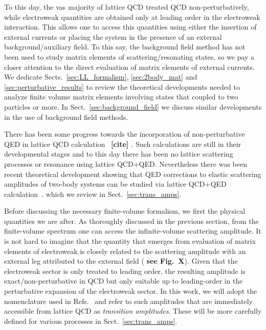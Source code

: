 \documentclass{iopart}
\newcommand{\raul}[0]{\bf \color{blue} }
\theoremstyle{definition}
\begin{document}
{To this day, the vas majority of lattice QCD treated QCD non-perturbatively, while electroweak quantities are obtained only at leading order in the electroweak interaction. This allows one to access this quantities  using either the insertion of external currents or placing the system in the presence of an external background/auxiliary field. To this say, the background field method has not been used to study matrix elements of scattering/resonating states, so we pay a closer attention to the direct evaluation of matrix elements of external currents. We dedicate Sects.~\ref{sec:LL_formalism}, \ref{sec:2body_mat} and \ref{sec:perturbative_results} to review the theoretical developments needed to analyze finite volume matrix elements involving states that coupled to two particles or more. In Sect.~\ref{sec:background_field} we discuss similar developments in the use of background field methods.  

There has been some progress towards the incorporation of non-perturbative QED in lattice QCD calculation~{\raul [cite] \cite{Endres:2015gda}}. Such calculations are still in their developmental stages and to this day there has been no lattice scattering processes or resonance using lattice QCD+QED. Nevertheless there was been recent theoretical development showing that QED corrections to elastic scattering amplitudes of two-body systems can be studied via lattice QCD+QED calculation~\cite{Beane:2014qha}. which we review in Sect.~\ref{sec:trans_amps}.

Before discussing the necessary finite-volume formalism, we first the physical quantities we are after. As thoroughly discussed in the previous section, from the finite-volume spectrum one can access the infinite-volume scattering amplitude. It is not hard to imagine that the quantity that emerges from evaluation of matrix elements of electroweak is closely related to the scattering amplitude with an external leg attributed to the external field ({\raul see Fig.~X}). Given that the electroweak sector is only treated to leading order, the resulting amplitude is exact/non-perturbative in QCD but only suitable up to leading-order in the perturbative expansion of the electroweak sector. In this work, we will adopt the nomenclature used in Refs.~\cite{Briceno:2014uqa, Briceno:2015csa, Briceno:2015tza} and refer to such amplitudes that are immediately accessible from lattice QCD as \emph{transition amplitudes}. These will be more carefully defined for various processes in Sect.~\ref{sec:trans_amps}. 




}
\end{document}
